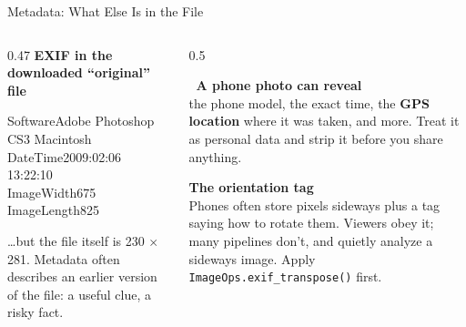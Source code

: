 \begin{frame}{Metadata: What Else Is in the File}
\begin{columns}[T]
\begin{column}{0.47\textwidth}
\textbf{EXIF in the downloaded ``original'' file}
\begin{codebox}[fontupper=\ttfamily\tiny]
Software\hspace*{2.6em}Adobe Photoshop CS3 Macintosh\\
DateTime\hspace*{2.6em}2009:02:06 13:22:10\\
ImageWidth\hspace*{1.4em}675\\
ImageLength\hspace*{0.85em}825
\end{codebox}
\ldots but the file itself is 230 $\times$ 281. Metadata often describes an earlier version of
the file: a useful clue, a risky fact.
\end{column}
\begin{column}{0.5\textwidth}
\begin{warnbox}
\textbf{\faMapMarker*\ A phone photo can reveal}\\
the phone model, the exact time, the \textbf{GPS location} where it was taken, and more.
Treat it as personal data and strip it before you share anything.
\end{warnbox}
\begin{graybox}
\textbf{The orientation tag}\\
Phones often store pixels sideways plus a tag saying how to rotate them. Viewers obey it; many
pipelines don't, and quietly analyze a sideways image. Apply
\texttt{ImageOps.exif\_transpose()} first.
\end{graybox}
\end{column}
\end{columns}
\end{frame}

